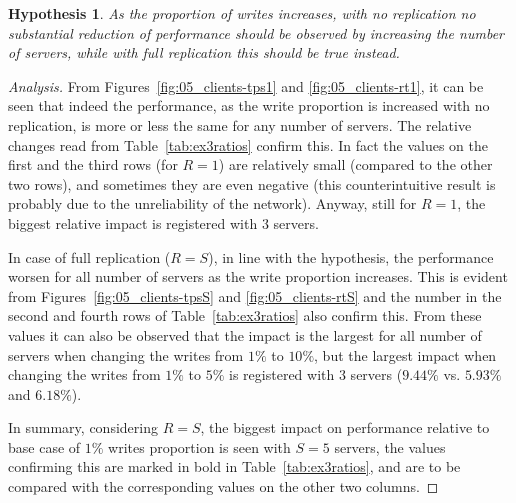 \documentclass[11pt]{article}
\newtheorem{hyp}{Hypothesis}
\theoremstyle{definition}
\newenvironment{ana}[1][\proofname]{\begin{proof}[Analysis]}{\end{proof}}
\begin{document}
\begin{hyp}
    As the proportion of writes increases, with no replication no substantial reduction of performance should be observed by increasing the number of servers, while with full replication this should be true instead.
\end{hyp}
\begin{ana}
    From Figures~\ref{fig:05_clients-tps1} and \ref{fig:05_clients-rt1}, it can be seen that indeed the performance, as the write proportion is increased with no replication, is more or less the same for any number of servers.
    The relative changes%
    read from Table~\ref{tab:ex3ratios} confirm this.
    In fact the values on the first and the third rows (for $R=1$) are relatively small (compared to the other two rows), and sometimes they are even negative (this counterintuitive result is probably due to the unreliability of the network).
    Anyway, still for $R=1$, the biggest relative impact is registered with $3$ servers.
    
    In case of full replication ($R=S$), in line with the hypothesis, the performance worsen for all number of servers as the write proportion increases.
    This is evident from Figures~\ref{fig:05_clients-tpsS} and \ref{fig:05_clients-rtS} and the number in the second and fourth rows of Table~\ref{tab:ex3ratios} also confirm this.
    From these values it can also be observed that the impact is the largest for all number of servers when changing the writes from $1\%$ to $10\%$, but the largest impact when changing the writes from $1\%$ to $5\%$ is registered with $3$ servers ($9.44\%$ vs. $5.93\%$ and $6.18\%$).
    
    In summary, considering $R=S$, the biggest impact on performance relative to base case of $1\%$ writes proportion is seen with $S=5$ servers, the values confirming this are marked in bold in Table~\ref{tab:ex3ratios}, and are to be compared with the corresponding values on the other two columns.
\end{ana}
\end{document}
